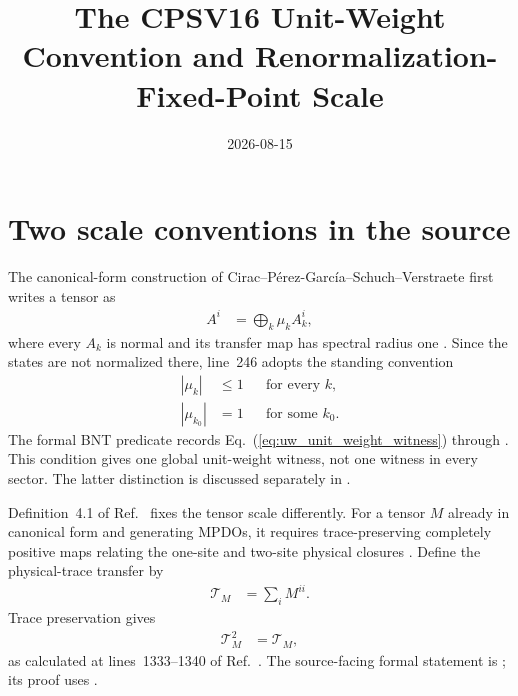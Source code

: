 \documentclass{article}
\title{The CPSV16 Unit-Weight Convention and Renormalization-Fixed-Point Scale}
\author{}
\date{2026-08-15}
\begin{document}
\maketitle
{}

\section{Two scale conventions in the source}

The canonical-form construction of
Cirac--P\'erez-Garc\'ia--Schuch--Verstraete first writes a tensor as
\begin{align}
    A^i
    &=\bigoplus_k \mu_k A_k^i,
    \label{eq:uw_canonical_decomposition}
\end{align}
where every $A_k$ is normal and its transfer map has spectral radius one
\cite[lines~214--246]{Cirac2016MPDO_arXiv}. Since the states are not normalized
there, line~246 adopts the standing convention
\begin{align}
    |\mu_k|
    &\leq 1
    &&\text{for every $k$},
    \label{eq:uw_weight_upper_bound}\\
    |\mu_{k_0}|
    &=1
    &&\text{for some $k_0$}.
    \label{eq:uw_unit_weight_witness}
\end{align}
The formal BNT predicate records
Eq.~(\ref{eq:uw_unit_weight_witness}) through
. This condition gives
one global unit-weight witness, not one witness in every sector. The latter
distinction is discussed separately in
.

Definition~4.1 of Ref.~\cite{Cirac2016MPDO_arXiv} fixes the tensor scale
differently. For a tensor $M$ already in canonical form and generating MPDOs,
it requires trace-preserving completely positive maps relating the one-site
and two-site physical closures
\cite[lines~645--660]{Cirac2016MPDO_arXiv}. Define the physical-trace transfer
by
\begin{align}
    \mathcal T_M
    &=\sum_i M^{ii}.
    \label{eq:uw_physical_trace_transfer}
\end{align}
Trace preservation gives
\begin{align}
    \mathcal T_M^2
    &=\mathcal T_M,
    \label{eq:uw_physical_idempotence}
\end{align}
as calculated at lines~1333--1340 of
Ref.~\cite{Cirac2016MPDO_arXiv}. The source-facing formal statement is
; its proof uses
.
\end{document}
